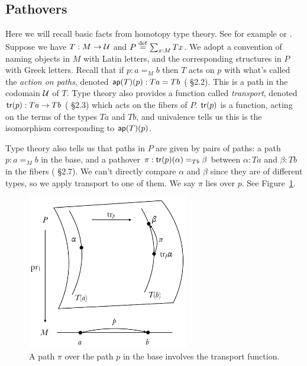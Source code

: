 \subsection{Pathovers}
\label{sec:pathovers}
Here we will recall basic facts from homotopy type theory. See for example \cite{hottbook} or \cite{egbert}. Suppose we have \( T:M\to\mathcal{U} \) and \( P\stackrel{\mathrm{def}}{=}\sum_{x:M}Tx \). We adopt a convention of naming objects in \( M \) with Latin letters, and the corresponding structures in \( P \) with Greek letters. Recall that if \( p:a=_M b \) then \( T \) acts on \( p \) with what's called the \emph{action on paths}, denoted \( \mathsf{ap}(T)(p):Ta=Tb \) (\cite{hottbook} §2.2). This is a path in the codomain \( \mathcal{U} \) of \( T \). Type theory also provides a function called \emph{transport}, denoted \( \mathsf{tr}(p):Ta\to Tb \) (\cite{hottbook} §2.3) which acts on the fibers of \( P \). \( \mathsf{tr}(p) \) is a function, acting on the terms of the types \( Ta \) and \( Tb \), and univalence tells us this is the isomorphism corresponding to \( \mathsf{ap}(T)(p) \).

Type theory also tells us that paths in \( P \) are given by pairs of paths: a path \( p:a=_M b \) in the base, and a pathover \( \pi:\mathsf{tr}(p)(\alpha)=_{Tb}\beta \) between \( \alpha:Ta \) and \( \beta:Tb \) in the fibers (\cite{hottbook} §2.7). We can't directly compare \( \alpha \) and \( \beta \) since they are of different types, so we apply transport to one of them. We say \( \pi \) lies over \( p \). See Figure~\ref{fig:pathovers}.

\begin{figure}[H]
\centering
\includegraphics[width=200pt]{figs/pathovers.pdf}
\caption{A path \( \pi \) over the path \( p \) in the base involves the transport function.}
\label{fig:pathovers}
\end{figure}

